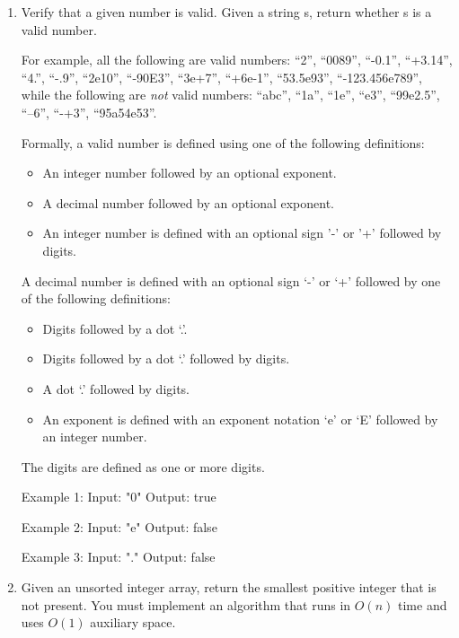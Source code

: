\newpage
\begin{enumerate}
\item Verify that a given number is valid.
Given a string s, return whether s is a valid number.

For example, all the following are valid numbers: ``2'', ``0089'', ``-0.1'', ``+3.14'', ``4.'', ``-.9'', ``2e10'', ``-90E3'', ``3e+7'', ``+6e-1'', ``53.5e93'', ``-123.456e789'', while the following are \textit{not} valid numbers: ``abc'', ``1a'', ``1e'', ``e3'', ``99e2.5'', ``--6'', ``-+3'', ``95a54e53''.

Formally, a valid number is defined using one of the following definitions:
\begin{itemize}
\item An integer number followed by an optional exponent.
\item A decimal number followed by an optional exponent.
\item An integer number is defined with an optional sign '-' or '+' followed by digits.
\end{itemize}

A decimal number is defined with an optional sign \lq -' or \lq +'
followed by one of the following definitions:
\begin{itemize}
\item Digits followed by a dot \lq .'.
\item Digits followed by a dot \lq .' followed by digits.
\item A dot \lq .' followed by digits.
\item An exponent is defined with an exponent notation \lq e' or \lq E'
followed by an integer number.
\end{itemize}
The digits are defined as one or more digits.
\begin{consolethree}
Example 1:
Input: "0"
Output: true

Example 2:
Input: "e"
Output: false

Example 3:
Input: "."
Output: false
\end{consolethree}
\newpage


\item 
Given an unsorted integer array, return the smallest positive integer that is not present.
You must implement an algorithm that runs in $O(n)$ time and uses $O(1)$
auxiliary space.


\end{enumerate}
